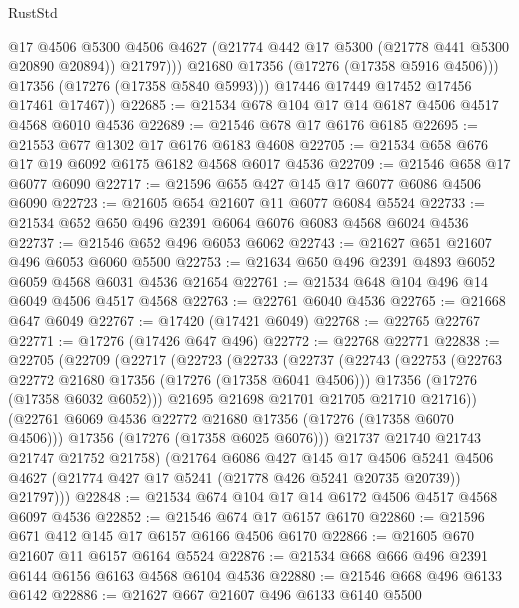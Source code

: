 \begin{lexlean}{RustStd}
\begin{coremodule}
                  @17
                  @4506
                  @5300
                  @4506
                  @4627
                  (@21774 @442 @17 @5300 (@21778 @441 @5300 @20890 @20894))
                  @21797)))
            @21680
            @17356
            (@17276 (@17358 @5916 @4506)))
          @17356
          (@17276 (@17358 @5840 @5993)))
        @17446
        @17449
        @17452
        @17456
        @17461
        @17467))
@22685 := @21534 @678 @104 @17 @14 @6187 @4506 @4517 @4568 @6010 @4536
@22689 := @21546 @678 @17 @6176 @6185
@22695 := @21553 @677 @1302 @17 @6176 @6183 @4608
@22705 := @21534 @658 @676 @17 @19 @6092 @6175 @6182 @4568 @6017 @4536
@22709 := @21546 @658 @17 @6077 @6090
@22717 := @21596 @655 @427 @145 @17 @6077 @6086 @4506 @6090
@22723 := @21605 @654 @21607 @11 @6077 @6084 @5524
@22733 := @21534 @652 @650 @496 @2391 @6064 @6076 @6083 @4568 @6024 @4536
@22737 := @21546 @652 @496 @6053 @6062
@22743 := @21627 @651 @21607 @496 @6053 @6060 @5500
@22753 := @21634 @650 @496 @2391 @4893 @6052 @6059 @4568 @6031 @4536 @21654
@22761 := @21534 @648 @104 @496 @14 @6049 @4506 @4517 @4568
@22763 := @22761 @6040 @4536
@22765 := @21668 @647 @6049
@22767 := @17420 (@17421 @6049)
@22768 := @22765 @22767
@22771 := @17276 (@17426 @647 @496)
@22772 := @22768 @22771
@22838 := @22705
    (@22709
      (@22717
        (@22723
          (@22733
            (@22737
              (@22743
                (@22753
                  (@22763 @22772 @21680 @17356 (@17276 (@17358 @6041 @4506)))
                  @17356
                  (@17276 (@17358 @6032 @6052)))
                @21695
                @21698
                @21701
                @21705
                @21710
                @21716))
            (@22761 @6069 @4536 @22772 @21680 @17356 (@17276 (@17358 @6070 @4506)))
            @17356
            (@17276 (@17358 @6025 @6076)))
          @21737
          @21740
          @21743
          @21747
          @21752
          @21758)
        (@21764
          @6086
          @427
          @145
          @17
          @4506
          @5241
          @4506
          @4627
          (@21774 @427 @17 @5241 (@21778 @426 @5241 @20735 @20739))
          @21797)))
@22848 := @21534 @674 @104 @17 @14 @6172 @4506 @4517 @4568 @6097 @4536
@22852 := @21546 @674 @17 @6157 @6170
@22860 := @21596 @671 @412 @145 @17 @6157 @6166 @4506 @6170
@22866 := @21605 @670 @21607 @11 @6157 @6164 @5524
@22876 := @21534 @668 @666 @496 @2391 @6144 @6156 @6163 @4568 @6104 @4536
@22880 := @21546 @668 @496 @6133 @6142
@22886 := @21627 @667 @21607 @496 @6133 @6140 @5500

\end{coremodule}
\end{lexlean}
